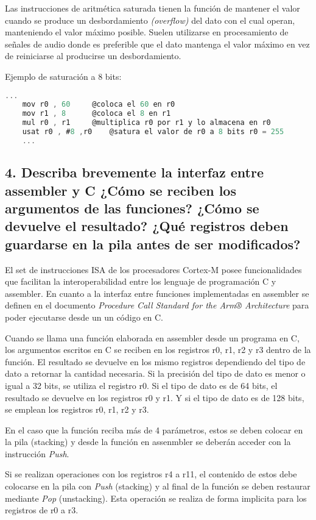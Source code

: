 \documentclass[10pt,a4paper,twoside,spanish]{article}	%
\begin{document}
Las instrucciones de aritmética saturada tienen la función de mantener el valor cuando se produce un desbordamiento \textit{(overflow)} del dato con el cual operan, manteniendo el valor máximo posible. Suelen utilizarse en procesamiento de señales de audio donde es preferible que el dato mantenga el valor máximo en vez de reiniciarse al producirse un desbordamiento.

Ejemplo de saturación a 8 bits:

\begin{lstlisting}[language=C]
	...
	mov r0 , 60		@coloca el 60 en r0 
	mov r1 , 8		@coloca el 8 en r1
	mul r0 , r1		@multiplica r0 por r1 y lo almacena en r0
	usat r0 , #8 ,r0	@satura el valor de r0 a 8 bits r0 = 255	
	...
\end{lstlisting}

\subsection*{4. Describa brevemente la interfaz entre assembler y C ¿Cómo se reciben los argumentos de las funciones? ¿Cómo se devuelve el resultado? ¿Qué registros deben guardarse en la pila antes de ser modificados?}

El set de instrucciones ISA de los procesadores Cortex-M posee funcionalidades que facilitan la 
interoperabilidad entre los lenguaje de programación C y assembler. En cuanto a la interfaz entre funciones implementadas en assembler se definen en el documento \textit{Procedure Call Standard for the Arm® Architecture} para poder ejecutarse desde un un código en C.

Cuando se llama una función elaborada en assembler desde un programa en C, los argumentos escritos en C se reciben en los registros r0, r1, r2 y r3 dentro de la función. El resultado se devuelve en los mismo registros dependiendo del tipo de dato a retornar la cantidad necesaria. Si la precisión del tipo de dato es menor o igual a 32 bits, se utiliza el registro r0. Si el tipo de dato es de 64 bits, el resultado se devuelve en los registros r0 y r1. Y si el tipo de dato es de 128 bits, se emplean los registros r0, r1, r2 y r3.

En el caso que la función reciba más de 4 parámetros, estos se deben  colocar en la pila (stacking) y desde la función en assenmbler se deberán acceder con la instrucción \textit{Push}.

Si se realizan operaciones con los registros r4 a r11, el contenido de estos debe colocarse en la pila con \textit{Push} (stacking) y al final de la  función se deben restaurar mediante \textit{Pop} (unstacking). Esta operación se realiza de forma implicita para los registros de r0 a r3.
\end{document}
